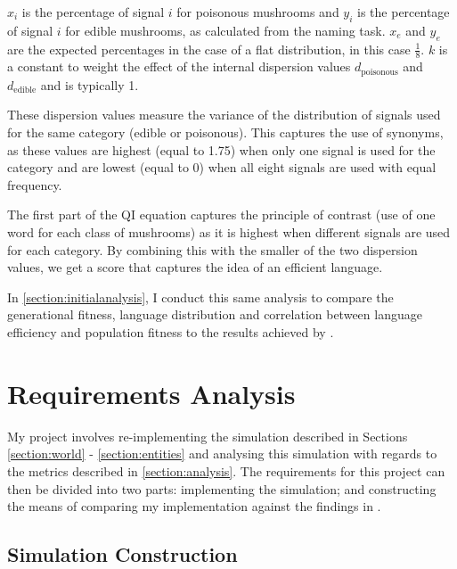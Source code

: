 \documentclass[12pt,a4paper]{report}
\begin{document}
$x_i$ is the percentage of signal $i$ for poisonous mushrooms and $y_i$ is the percentage of signal $i$ for edible mushrooms, as calculated from the naming task. $x_e$ and $y_e$ are the expected percentages in the case of a flat distribution, in this case $\frac{1}{8}$. $k$ is a constant to weight the effect of the internal dispersion values $d_{\mathrm{poisonous}}$ and $d_{\mathrm{edible}}$ and is typically 1.

These dispersion values measure the variance of the distribution of signals used for the same category (edible or poisonous). This captures the use of synonyms, as these values are highest (equal to 1.75) when only one signal is used for the category and are lowest (equal to 0) when all eight signals are used with equal frequency.

The first part of the QI equation captures the principle of contrast (use of one word for each class of mushrooms) as it is highest when different signals are used for each category. By combining this with the smaller of the two dispersion values, we get a score that captures the idea of an efficient language.

In \cref{section:initialanalysis}, I conduct this same analysis to compare the generational fitness, language distribution and correlation between language efficiency and population fitness to the results achieved by \citet{Cangelosi1998}.


\section{Requirements Analysis}\label{section:requirements}

My project involves re-implementing the simulation described in Sections \ref{section:world} - \ref{section:entities} and analysing this simulation with regards to the metrics described in \cref{section:analysis}. The requirements for this project can then be divided into two parts: implementing the simulation; and constructing the means of comparing my implementation against the findings in \citet{Cangelosi1998}.

\subsection*{Simulation Construction}
\end{document}
